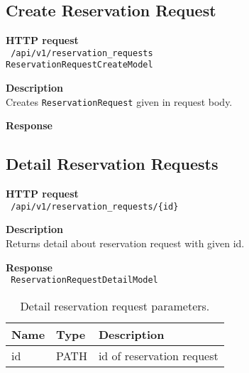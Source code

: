 \subsection{Create Reservation Request}
\begin{description}
    \item \textbf{HTTP request}\\
        \texttt{\text{[POST]} /api/v1/reservation\_requests\\
        ReservationRequestCreateModel}
    \item \textbf{Description}\\
        Creates \texttt{ReservationRequest} given in request body.
    \item \textbf{Response}\\
        \texttt{\text{[200 OK]}}
\end{description}

\subsection{Detail Reservation Requests}
\begin{description}
    \item \textbf{HTTP request}\\
        \texttt{\text{[GET]} /api/v1/reservation\_requests/\{id\}}
    \item \textbf{Description}\\
        Returns detail about reservation request with given id.
    \item \textbf{Response}\\
        \texttt{\text{[200 OK]} ReservationRequestDetailModel}
\end{description}
\begin{table}[ht!]
    \begin{tabularx}{\textwidth}{llX}
        \toprule
        Name & Type & Description \\
        \midrule
        id & PATH & id of reservation request \\
        \bottomrule
        \end{tabularx}
    \caption{Detail reservation request parameters.}
\end{table}

